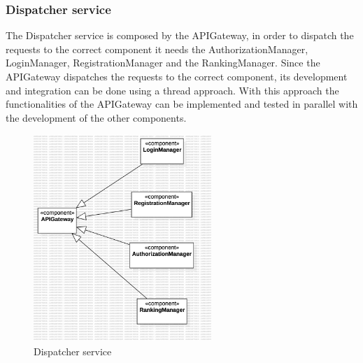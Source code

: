 \subsubsection*{Dispatcher service}
The Dispatcher service is composed by the APIGateway, in order to dispatch the requests to the correct component it needs the AuthorizationManager, LoginManager, RegistrationManager and the RankingManager.
Since the APIGateway dispatches the requests to the correct component, its development and integration can be done using a thread approach. With this approach the functionalities of the APIGateway can be implemented and tested in parallel with the development of the other components.
\begin{figure}[H]
    \centering
    \includegraphics[width=0.6\textwidth]{Diagrams/DispatcherIntegrationPlan.jpg}
    \caption{Dispatcher service}
    \label{fig:dispatcher}
\end{figure}
\clearpage
